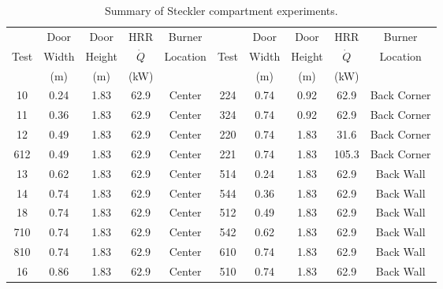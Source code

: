 \begin{table}[h!]
\caption[Summary of Steckler compartment experiments]{Summary of Steckler compartment experiments.}
\begin{center}
\begin{tabular}{|c|c|c|c|c||c|c|c|c|c|}
\hline
        & Door      & Door          &  HRR       & Burner       &       & Door      & Door        &  HRR         & Burner        \\
Test    & Width     & Height        & $\dot{Q}$  & Location     & Test  & Width     & Height      & $\dot{Q}$    & Location      \\
        & (m)       & (m)           & (kW)       &              &       & (m)       &  (m)        & (kW)         &                \\ \hline \hline
10      & 0.24      & 1.83          &  62.9      & Center       & 224   & 0.74      & 0.92        &  62.9         & Back Corner         \\ \hline
11      & 0.36      & 1.83          &  62.9      & Center       & 324   & 0.74      & 0.92        &  62.9         & Back Corner         \\ \hline
12      & 0.49      & 1.83          &  62.9      & Center       & 220   & 0.74      & 1.83        &  31.6         & Back Corner         \\ \hline
612     & 0.49      & 1.83          &  62.9      & Center       & 221   & 0.74      & 1.83        &  105.3        & Back Corner         \\ \hline
13      & 0.62      & 1.83          &  62.9      & Center       & 514   & 0.24      & 1.83        &  62.9         & Back Wall           \\ \hline
14      & 0.74      & 1.83          &  62.9      & Center       & 544   & 0.36      & 1.83        &  62.9         & Back Wall           \\ \hline
18      & 0.74      & 1.83          &  62.9      & Center       & 512   & 0.49      & 1.83        &  62.9         & Back Wall           \\ \hline
710     & 0.74      & 1.83          &  62.9      & Center       & 542   & 0.62      & 1.83        &  62.9         & Back Wall           \\ \hline
810     & 0.74      & 1.83          &  62.9      & Center       & 610   & 0.74      & 1.83        &  62.9         & Back Wall           \\ \hline
16      & 0.86      & 1.83          &  62.9      & Center       & 510   & 0.74      & 1.83        &  62.9         & Back Wall           \\ \hline

\end{tabular}
\end{center}
\end{table}
